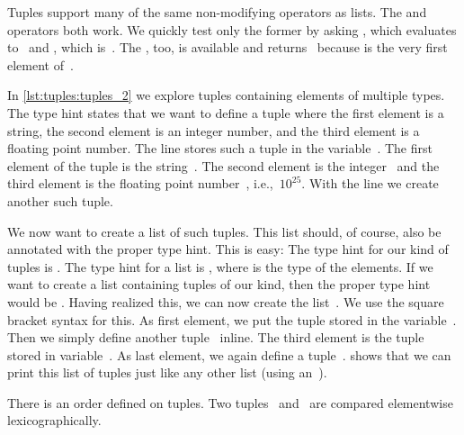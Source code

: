 Tuples support many of the same non-modifying operators as lists.
The  and  operators both work.
We quickly test only the former by asking , which evaluates to~ and , which is~.
The , too, is available and  returns~ because  is the very first element of~.
%
\begin{sloppypar}%
In \cref{lst:tuples:tuples_2} we explore tuples containing elements of multiple types.
The type hint  states that we want to define a tuple where the first element is a string, the second element is an integer number, and the third element is a floating point number.
The line  stores such a tuple in the variable~.
The first element of the tuple is the string~.
The second element is the integer~ and the third element is the floating point number~, i.e.,~$10^{25}$.
With the line  we create another such tuple.%
\end{sloppypar}%
%
\begin{sloppypar}%
We now want to create a list of such tuples.
This list should, of course, also be annotated with the proper type hint.
This is easy:
The type hint for our kind of tuples is .
The type hint for a list is , where  is the type of the elements.
If we want to create a list containing tuples of our kind, then the proper type hint would be .
Having realized this, we can now create the list~.
We use the square bracket syntax for this.
As first element, we put the tuple stored in the variable~.
Then we simply define another tuple~ inline.
The third element is the tuple stored in variable~.
As last element, we again define a tuple~.
 shows that we can print this list of tuples just like any other list (using an~).%
\end{sloppypar}%
%
There is an order defined on tuples.
Two tuples~ and~ are compared elementwise lexicographically.
